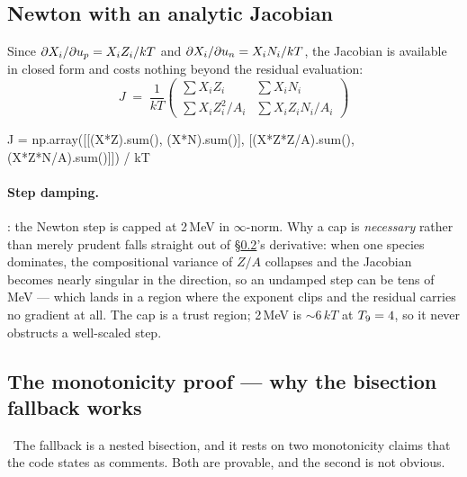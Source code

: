 \subsection{Newton with an analytic Jacobian}
\label{sec:newton}

Since $\partial X_i/\partial u_{p} = X_i Z_i/kT$ and
$\partial X_i/\partial u_{n} = X_i N_i/kT$, the Jacobian is available in closed
form and costs nothing beyond the residual evaluation:
%
\begin{equation}
J \;=\; \frac{1}{kT}
\begin{pmatrix}
\sum X_iZ_i & \sum X_iN_i\\[2pt]
\sum X_iZ_i^2/A_i & \sum X_iZ_iN_i/A_i
\end{pmatrix}
\label{eq:nsejacobian}
\end{equation}

\begin{srclisting}
J = np.array([[(X*Z).sum(),       (X*N).sum()],
              [(X*Z*Z/A).sum(),   (X*Z*N/A).sum()]]) / kT
\end{srclisting}

\paragraph{Step damping.} : the Newton step is
capped at 2\,MeV in $\infty$-norm. Why a cap is \emph{necessary} rather than
merely prudent falls straight out of \S\ref{sec:monotonicity}'s derivative: when
one species dominates, the compositional variance of $Z/A$ collapses and the
Jacobian becomes nearly singular in the \up{} direction, so an undamped step can
be tens of MeV --- which lands in a region where the exponent clips and the
residual carries no gradient at all. The cap is a trust region; 2\,MeV is
${\sim}6\,kT$ at $T_{9} = 4$, so it never obstructs a well-scaled step.

\subsection{The monotonicity proof --- why the bisection fallback works}
\label{sec:monotonicity}

\begin{warn}
\warnglyph{}~The fallback is a nested bisection, and it rests on two monotonicity
claims that the code states as comments. Both are provable, and the second is
not obvious.
\end{warn}

